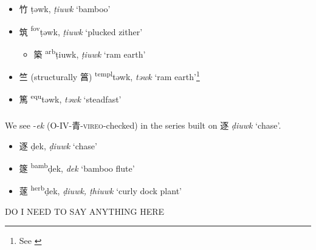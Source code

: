     
\begin{itemize}
    \item {\Large{竹}} %
    {\large{ṭəwk}},
    \textit{ṭiuwk} `bamboo' %

    \item {\Large{筑}} %
    {\large{{\textsuperscript{fov}}ṭəwk}},     
    \textit{ṭiuwk} `plucked zither' %



    \begin{itemize}
    \item {\Large{築}} %
    {\large{{\textsuperscript{arb}}ṭiuwk}},
    \textit{ṭiuwk} `ram earth' %

\end{itemize}
    \item {\Large{竺}}
    (structurally {\Large{䈞}})
    {\large{{\textsuperscript{templ}}təwk}}, 
    \textit{təwk} `ram earth'\footnote{See \cite{Wu2024}} %
    

    \item {\Large{篤}} %
    {\large{{\textsuperscript{equ}}təwk}},   
    \textit{təwk} `steadfast' %
\end{itemize}

\subparagraph{}
We see -\textit{ek} (O-IV-青-\textsc{vireo}-checked) in the series built on 逐 \textit{ḍiuwk} `chase'. 


\begin{itemize}
    \item {\Large{逐}} %
    {\large{ḍek}},
    \textit{ḍiuwk} `chase' %

    \item {\Large{篴}} %
    {\large{{\textsuperscript{bamb}}ḍek}},
    \textit{dek} `bamboo flute' %

    \item {\Large{蓫}} %
    {\large{{\textsuperscript{herb}}ḍek}},
    \textit{ḍiuwk, ṭhiuwk} `curly dock plant' %
\end{itemize}

DO I NEED TO SAY ANYTHING HERE 

